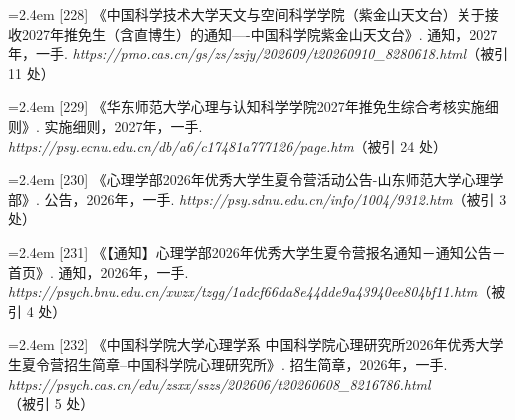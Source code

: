 {\nopagebreak\vspace{1pt}
\noindent\hangindent=2.4em \label{src:S0294}{\color{cAccent}[228]} 《中国科学技术大学天文与空间科学学院（紫金山天文台）关于接收2027年推免生（含直博生）的通知----中国科学院紫金山天文台》. 通知，2027年，一手. \textit{https://pmo.cas.cn/gs/zs/zsjy/202609/t20260910\_8280618.html}（被引 11 处）\par
\vspace{0.6pt}
\vspace{3.5pt}\par
\nopagebreak\vspace{1pt}
\noindent\hangindent=2.4em \label{src:S0295}{\color{cAccent}[229]} 《华东师范大学心理与认知科学学院2027年推免生综合考核实施细则》. 实施细则，2027年，一手. \textit{https://psy.ecnu.edu.cn/db/a6/c17481a777126/page.htm}（被引 24 处）\par
\vspace{0.6pt}
\vspace{3.5pt}\par
\nopagebreak\vspace{1pt}
\noindent\hangindent=2.4em \label{src:S0296}{\color{cAccent}[230]} 《心理学部2026年优秀大学生夏令营活动公告-山东师范大学心理学部》. 公告，2026年，一手. \textit{https://psy.sdnu.edu.cn/info/1004/9312.htm}（被引 3 处）\par
\vspace{0.6pt}
\vspace{3.5pt}\par
\nopagebreak\vspace{1pt}
\noindent\hangindent=2.4em \label{src:S0297}{\color{cAccent}[231]} 《【通知】心理学部2026年优秀大学生夏令营报名通知－通知公告－首页》. 通知，2026年，一手. \textit{https://psych.bnu.edu.cn/xwzx/tzgg/1adcf66da8e44dde9a43940ee804bf11.htm}（被引 4 处）\par
\vspace{0.6pt}
\vspace{3.5pt}\par
\nopagebreak\vspace{1pt}
\noindent\hangindent=2.4em \label{src:S0298}{\color{cAccent}[232]} 《中国科学院大学心理学系 中国科学院心理研究所2026年优秀大学生夏令营招生简章--中国科学院心理研究所》. 招生简章，2026年，一手. \textit{https://psych.cas.cn/edu/zsxx/sszs/202606/t20260608\_8216786.html}（被引 5 处）\par
}
